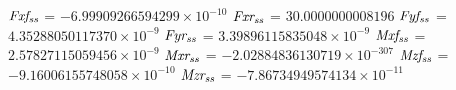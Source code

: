 ${ \it Fxf_{ss}      }$    = $-6.99909266594299\times10^{-10}    $           
${ \it Fxr_{ss}      }$    = $30.0000000008196                   $      
${ \it Fyf_{ss}      }$    = $4.35288050117370\times10^{-9}      $           
${ \it Fyr_{ss}      }$    = $3.39896115835048\times10^{-9}      $           
${ \it Mxf_{ss}      }$    = $2.57827115059456\times10^{-9}      $           
${ \it Mxr_{ss}      }$    = $-2.02884836130719\times10^{-307}   $           
${ \it Mzf_{ss}      }$    = $-9.16006155748058\times10^{-10}    $           
${ \it Mzr_{ss}      }$    = $-7.86734949574134\times10^{-11}    $           
